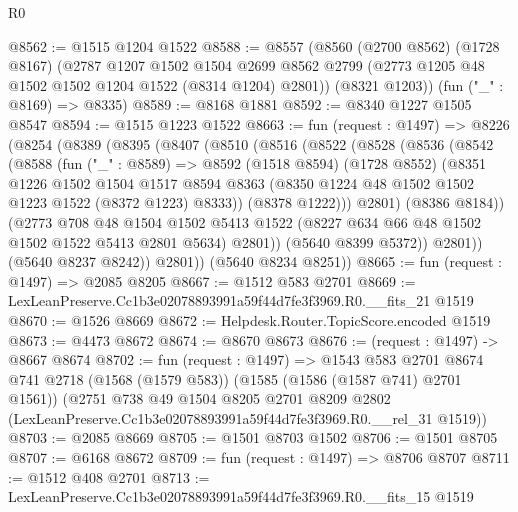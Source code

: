 \begin{lexlean}{R0}
\begin{coremodule}
@8562 := @1515 @1204 @1522
@8588 := @8557
    (@8560
      (@2700 @8562)
      (@1728 @8167)
      (@2787
        @1207
        @1502
        @1504
        @2699
        @8562
        @2799
        (@2773 @1205 @48 @1502 @1502 @1204 @1522 (@8314 @1204) @2801))
      (@8321 @1203))
    (fun ("_" : @8169) => @8335)
@8589 := @8168 @1881
@8592 := @8340 @1227 @1505 @8547
@8594 := @1515 @1223 @1522
@8663 := fun (request : @1497) =>
  @8226
    (@8254
      (@8389
        (@8395
          (@8407
            (@8510
              (@8516
                (@8522
                  (@8528
                    (@8536
                      (@8542
                        (@8588
                          (fun ("_" : @8589) =>
                          @8592
                            (@1518 @8594)
                            (@1728 @8552)
                            (@8351
                              @1226
                              @1502
                              @1504
                              @1517
                              @8594
                              @8363
                              (@8350 @1224 @48 @1502 @1502 @1223 @1522 (@8372 @1223) @8333))
                            (@8378 @1222)))
                        @2801)
                      (@8386 @8184))
                    (@2773
                      @708
                      @48
                      @1504
                      @1502
                      @5413
                      @1522
                      (@8227 @634 @66 @48 @1502 @1502 @1522 @5413 @2801 @5634)
                      @2801))
                  (@5640 @8399 @5372))
                @2801))
            (@5640 @8237 @8242))
          @2801))
      (@5640 @8234 @8251))
@8665 := fun (request : @1497) => @2085 @8205
@8667 := @1512 @583 @2701
@8669 := LexLeanPreserve.Cc1b3e02078893991a59f44d7fe3f3969.R0.__fits_21 @1519
@8670 := @1526 @8669
@8672 := Helpdesk.Router.TopicScore.encoded @1519
@8673 := @4473 @8672
@8674 := @8670 @8673
@8676 := (request : @1497) -> @8667 @8674
@8702 := fun (request : @1497) =>
  @1543
    @583
    @2701
    @8674
    @741
    @2718
    (@1568 (@1579 @583))
    (@1585 (@1586 (@1587 @741) @2701 @1561))
    (@2751
      @738
      @49
      @1504
      @8205
      @2701
      @8209
      @2802
      (LexLeanPreserve.Cc1b3e02078893991a59f44d7fe3f3969.R0.__rel_31 @1519))
@8703 := @2085 @8669
@8705 := @1501 @8703 @1502
@8706 := @1501 @8705
@8707 := @6168 @8672
@8709 := fun (request : @1497) => @8706 @8707
@8711 := @1512 @408 @2701
@8713 := LexLeanPreserve.Cc1b3e02078893991a59f44d7fe3f3969.R0.__fits_15 @1519

\end{coremodule}
\end{lexlean}

